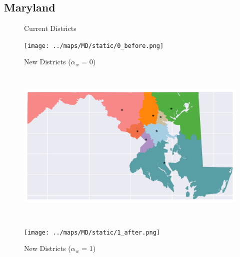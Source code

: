\subsection{Maryland}
\begin{figure}[htb!] \centering
\caption{ Current Districts }
\texttt{[image: ../maps/MD/static/0\_before.png]}
\caption{ New Districts ($\alpha_w$ = 0) }
\includegraphics[width=5in,height=3in,keepaspectratio]{../maps/MD/static/0_after.png}
\caption{ New Districts ($\alpha_w$ = 1) }
\texttt{[image: ../maps/MD/static/1\_after.png]}
\end{figure}

\clearpage
\newpage

